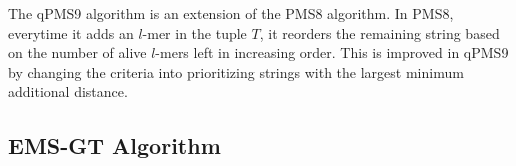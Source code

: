 The qPMS9 algorithm is an extension of the PMS8 algorithm. In PMS8, everytime it adds an $l$-mer in the tuple $T$, it reorders the remaining string based on the number of alive $l$-mers left in increasing order. This is improved in qPMS9 by changing the criteria into prioritizing strings with the largest minimum additional distance.


\subsection{EMS-GT Algorithm}



